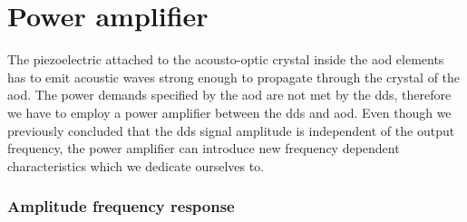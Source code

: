 \section{Power amplifier}

The piezoelectric attached to the acousto-optic crystal inside the \gls{aod}
elements has to emit acoustic waves strong enough to propagate through the
crystal of the \gls{aod}. The power demands specified by the \gls{aod} are
not met by the \gls{dds}, therefore we have to employ a power amplifier
between the \gls{dds} and \gls{aod}. Even though we previously concluded that
the \gls{dds} signal amplitude is independent of the output frequency, the
power amplifier can introduce new frequency dependent characteristics which
we dedicate ourselves to.

\subsubsection{Amplitude frequency response}\label{subsec:electronic_amplitude_frequency_response}

